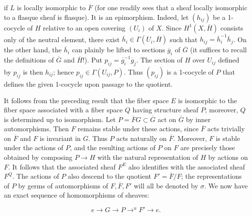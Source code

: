 
\noindent if $L$ is locally isomorphic to $\overline F$ (for one readily sees that a
sheaf locally isomorphic to a flasque sheaf is flasque). It is an epimorphism.
Indeed, let $(h_{ij})$ be a 1-cocycle of $H$ relative to an open covering
$(U_i)$ of $X$. Since $H^1(X,\overline H)$ consists only of the neutral
element, there exist $\overline h_i\in\Gamma(U_i,\overline H)$ such that
$h_{ij}=\overline h_i^{-1}\overline h_j$. On the other hand, the
$\overline h_i$ can plainly be lifted to sections $\overline g_i$ of
$\overline G$ (it suffices to recall the definitions of $\overline G$ and
$\overline H$!). Put $p_{ij}=\overline g_i^{-1}\overline g_j$. The section
of $H$ over $U_{ij}$ defined by $p_{ij}$ is then $h_{ij}$; hence
$p_{ij}\in\Gamma(U_{ij},P)$. Thus $(p_{ij})$ is a 1-cocycle of $P$ that
defines the given 1-cocycle upon passage to the quotient.

It follows from the preceding result that the fiber space $E$ is isomorphic
to the fiber space associated with a fiber space $Q$ having structure sheaf
$P$; moreover, $Q$ is determined up to isomorphism.
Let $P=\overline F G\subset\overline G$ act on $\overline G$ by inner
automorphisms. Then $F$ remains stable under these actions, since
$\overline F$ acts trivially on $\overline F$ and $F$ is invariant in $G$.
Thus $P$ acts naturally on $\overline F$. Moreover, $F$ is stable under the
actions of $P$, and the resulting actions of $P$ on $F$ are precisely those
obtained by composing $P\to H$ with the natural representation
of $H$ by actions on $F$. It follows that the associated sheaf $F^E$ also
identifies with the associated sheaf $F^Q$. The actions of $P$ also descend
to the quotient $F'=\overline F/F$; the representations of $P$ by germs of
automorphisms of $F,\overline F,F'$ will all be denoted by $\sigma$. We now
have an exact sequence of homomorphisms of sheaves:

\[
e\to G\to P\mathop{\to}^{u}F'
\to e.
\]

